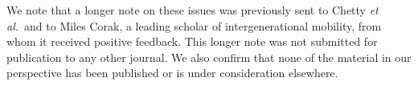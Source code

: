 \documentclass[12pt,letter,sans]{moderncv} %
\begin{document}
We note that a longer note on these issues was previously sent to Chetty \textit{et al.}~and to Miles Corak, a leading scholar of intergenerational mobility, from whom it received positive feedback. This longer note was not submitted for publication to any other journal. We also confirm that none of the material in our perspective has been published or is under consideration elsewhere.

\makeletterclosing
\end{document}
